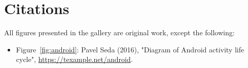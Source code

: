 
\section{Citations}

\par All figures presented in the gallery are original
work, except the following:

\begin{itemize}
  \item Figure~\ref{fig:android}: Pavel Seda (2016),
  "Diagram of Android activity life cycle", \url{https://texample.net/android}.
\end{itemize}

